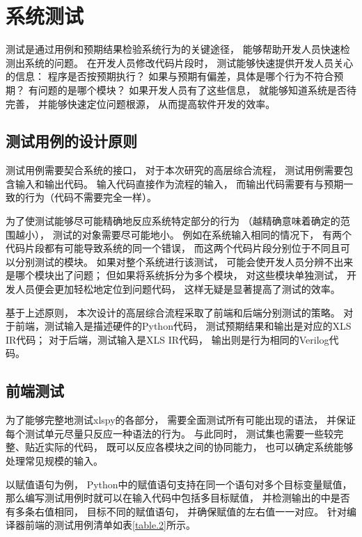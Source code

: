 \section{系统测试}

测试是通过用例和预期结果检验系统行为的关键途径，
能够帮助开发人员快速检测出系统的问题。
在开发人员修改代码片段时，
测试能够快速提供开发人员关心的信息：
程序是否按预期执行？
如果与预期有偏差，具体是哪个行为不符合预期？
有问题的是哪个模块？
如果开发人员有了这些信息，
就能够知道系统是否待完善，
并能够快速定位问题根源，
从而提高软件开发的效率。

\subsection{测试用例的设计原则}

测试用例需要契合系统的接口，
对于本次研究的高层综合流程，
测试用例需要包含输入和输出代码。
输入代码直接作为流程的输入，
而输出代码需要有与预期一致的行为（代码不需要完全一样）。

为了使测试能够尽可能精确地反应系统特定部分的行为
（越精确意味着确定的范围越小），
测试的对象需要尽可能地小。
例如在系统输入相同的情况下，
有两个代码片段都有可能导致系统的同一个错误，
而这两个代码片段分别位于不同且可以分别测试的模块。
如果对整个系统进行该测试，
可能会使开发人员分辨不出来是哪个模块出了问题；
但如果将系统拆分为多个模块，
对这些模块单独测试，
开发人员便会更加轻松地定位到问题代码，
这样无疑是显著提高了测试的效率。

基于上述原则，
本次设计的高层综合流程采取了前端和后端分别测试的策略。
对于前端，测试输入是描述硬件的Python代码，
测试预期结果和输出是对应的XLS IR代码；
对于后端，测试输入是XLS IR代码，
输出则是行为相同的Verilog代码。

\subsection{前端测试}

为了能够完整地测试xlspy的各部分，
需要全面测试所有可能出现的语法，
并保证每个测试单元尽量只反应一种语法的行为。
与此同时，
测试集也需要一些较完整、贴近实际的代码，
既可以反应各模块之间的协同能力，
也可以确定系统能够处理常见规模的输入。

以赋值语句为例，
Python中的赋值语句支持在同一个语句对多个目标变量赋值，
那么编写测试用例时就可以在输入代码中包括多目标赋值，
并检测输出的中是否有多条右值相同，
目标不同的赋值语句，
并确保赋值的左右值一一对应。
针对编译器前端的测试用例清单如表\ref{table.2}所示。

